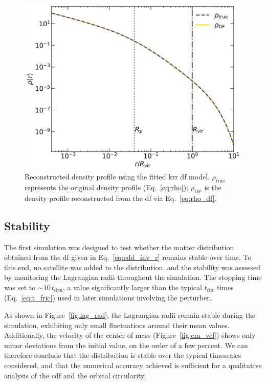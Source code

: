 \documentclass[twocolumn, a4paper]{article}
\begin{document}
\begin{figure}
    \centering
    \includegraphics[width=\columnwidth]{images/DF_rho.png}
    \caption{Reconstructed density profile using the fitted \acrshort{krr} \acrshort{df} model. \(\rho_\text{true}\) represents the original density profile (Eq.~\ref{eq:rho}); \(\rho_\text{DF}\) is the density profile reconstructed from the \acrshort{df} via Eq.~\ref{eq:rho_df}.}
    \label{fig:rho_df}
\end{figure}

\subsection{Stability}

The first simulation was designed to test whether the matter distribution obtained from the \acrshort{df} given in Eq.~\ref{eq:edd_inv_r} remains stable over time. To this end, no satellite was added to the distribution, and the stability was assessed by monitoring the Lagrangian radii throughout the simulation. The stopping time was set to \(\sim 10\, t_\text{dyn}\), a value significantly larger than the typical \(t_\text{fric}\) times (Eq.~\ref{eq:t_fric}) used in later simulations involving the perturber.

As shown in Figure~\ref{fig:lag_rad}, the Lagrangian radii remain stable during the simulation, exhibiting only small fluctuations around their mean values. Additionally, the velocity of the center of mass (Figure~\ref{fig:cm_vel}) shows only minor deviations from the initial value, on the order of a few percent. We can therefore conclude that the distribution is stable over the typical timescales considered, and that the numerical accuracy achieved is sufficient for a qualitative analysis of the \acrshort{cdf} and the orbital circularity.
\end{document}
